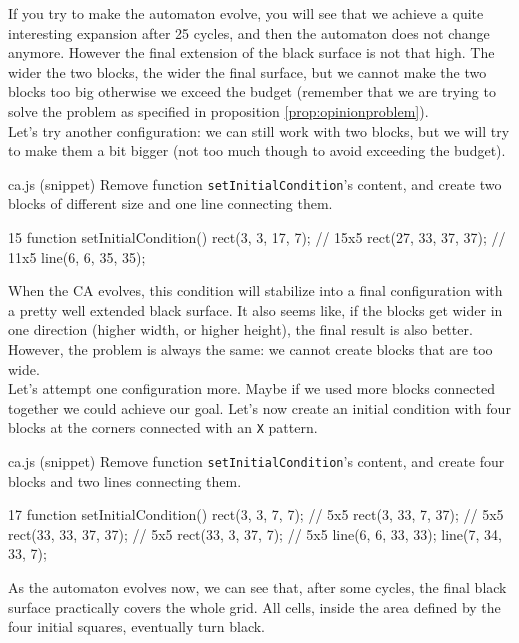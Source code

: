 If you try to make the automaton evolve, you will see that we achieve a quite interesting
expansion after 25 cycles, and then the automaton does not change anymore. However the
final extension of the black surface is not that high. The wider the two blocks, the wider the
final surface, but we cannot make the two blocks too big otherwise we exceed the
budget (remember that we are trying to solve the problem as specified in proposition
\ref{prop:opinionproblem}).\\

Let's try another configuration: we can still work with two blocks, but we will try to make them a
bit bigger (not too much though to avoid exceeding the budget).

\begin{programcode}{ca.js (snippet)}
Remove function \texttt{setInitialCondition}'s content, and create two blocks of different size and one
line connecting them.
\begin{codeh1}{1}{5}
function setInitialCondition() {
  rect(3, 3, 17, 7); // 15x5
  rect(27, 33, 37, 37); // 11x5
  line(6, 6, 35, 35);
}
\end{codeh1}
\end{programcode}

When the CA evolves, this condition will stabilize into a final configuration with a pretty well
extended black surface. It also seems like, if the blocks get wider in one direction
(higher width, or higher height), the final result is also better. However, the problem is always the same:
we cannot create blocks that are too wide.\\

Let's attempt one configuration more. Maybe if we used more blocks connected together we could achieve
our goal. Let's now create an initial condition with four blocks at the corners connected with
an \texttt{X} pattern.

\begin{programcode}{ca.js (snippet)}
Remove function \texttt{setInitialCondition}'s content, and create four blocks and two
lines connecting them.
\begin{codeh1}{1}{7}
function setInitialCondition() {
  rect(3, 3, 7, 7); // 5x5
  rect(3, 33, 7, 37); // 5x5
  rect(33, 33, 37, 37); // 5x5
  rect(33, 3, 37, 7); // 5x5
  line(6, 6, 33, 33);
  line(7, 34, 33, 7);
}
\end{codeh1}
\end{programcode}

As the automaton evolves now, we can see that, after some cycles, the final black surface practically covers the whole
grid. All cells, inside the area defined by the four initial squares, eventually turn black.

